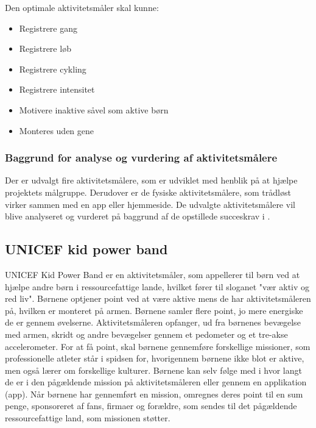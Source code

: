 Den optimale aktivitetsmåler skal kunne: 
\begin{itemize}
\item Registrere gang
\item Registrere løb
\item Registrere cykling
\item Registrere intensitet %
\item Motivere inaktive såvel som aktive børn %
\item Monteres uden gene
\end{itemize}

\subsubsection{Baggrund for analyse og vurdering af aktivitetsmålere}
Der er udvalgt fire aktivitetsmålere, som er udviklet med henblik på at hjælpe projektets målgruppe. Derudover er de fysiske aktivitetsmålere, som trådløst virker sammen med en app eller hjemmeside. 
De udvalgte aktivitetsmålere vil blive analyseret og vurderet på baggrund af de opstillede succeskrav i .


\subsection{UNICEF kid power band}
UNICEF Kid Power Band er en aktivitetsmåler, som appellerer til børn ved at hjælpe andre børn i ressourcefattige lande, hvilket fører til sloganet "vær aktiv og red liv". Børnene optjener point ved at være aktive mens de har aktivitetsmåleren på, hvilken er monteret på armen. Børnene samler flere point, jo mere energiske de er gennem øvelserne. Aktivitetsmåleren opfanger, ud fra børnenes bevægelse med armen, skridt og andre bevægelser gennem et pedometer og et tre-akse accelerometer. \citep{PowerAbout2015,PowerManual2015} \newline 
For at få point, skal børnene gennemføre forskellige missioner, som professionelle atleter står i spidsen for, hvorigennem børnene ikke blot er aktive, men også lærer om forskellige kulturer. \citep{PowerMission2015} 
Børnene kan selv følge med i hvor langt de er i den pågældende mission på aktivitetsmåleren eller gennem en applikation (app). Når børnene har gennemført en mission, omregnes deres point til en sum penge, sponsoreret af fans, firmaer og forældre, som sendes til det pågældende ressourcefattige land, som missionen støtter. \newline

